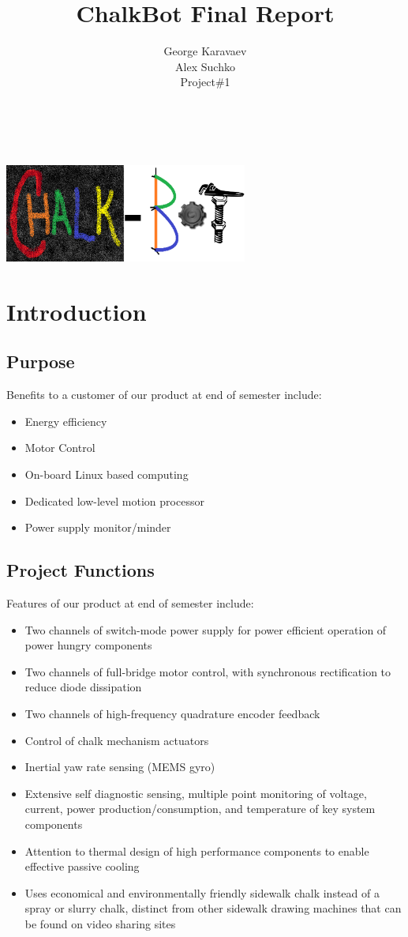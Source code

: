 \documentclass[12pt]{article}
\title{ChalkBot Final Report}
\author{George Karavaev\\Alex Suchko\\Project\#1}
\begin{document}
  \maketitle 
\\
\\
{\centering
\includegraphics[width=0.6\textwidth]{../chalk_bot_logo2.png}
}
\newpage
 \tableofcontents
\listoffigures
\newpage
 \section{Introduction}
\subsection{Purpose}
 Benefits to a customer of our product at end of semester include:
 \begin{itemize}
  \item Energy efficiency
  \item Motor Control
  \item On-board Linux based computing
  \item Dedicated low-level motion processor
  \item Power supply monitor/minder
\end{itemize}

\subsection{Project Functions}
Features of our product at end of semester include:
   \begin{itemize}
  \item Two channels of switch-mode power supply for power efficient operation of power hungry components
  \item Two channels of full-bridge motor control, with synchronous rectification to reduce diode dissipation
  \item Two channels of high-frequency quadrature encoder feedback
  \item Control of chalk mechanism actuators
  \item Inertial yaw rate sensing (MEMS gyro)
  \item Extensive self diagnostic sensing, multiple point monitoring of voltage, current, power production/consumption, and temperature of key system components
  \item Attention to thermal design of high performance components to enable effective passive cooling
  \item Uses economical and environmentally friendly sidewalk chalk instead of a spray or slurry chalk, distinct from other sidewalk drawing machines that can be found on video sharing sites
\end{itemize}
\end{document}

